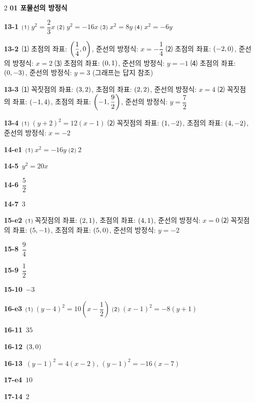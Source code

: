 \documentclass[10pt,a4paper]{article}
\begin{document}
\begin{multicols}{2}\small
\noindent\textbf{01 포물선의 방정식}\par\smallskip
\noindent\textbf{13-1}\ ⑴ $y^2=\dfrac{2}{3}x$ ⑵ $y^2=-16x$ ⑶ $x^2=8y$ ⑷ $x^2=-6y$\par
\noindent\textbf{13-2}\ ⑴ 초점의 좌표: $\left(\dfrac{1}{4}{,}\mkern3mu\mathopen{}0\right)$, 준선의 방정식: $x=-\dfrac{1}{4}$ ⑵ 초점의 좌표: $(-2{,}\mkern3mu\mathopen{}0)$, 준선의 방정식: $x=2$ ⑶ 초점의 좌표: $(0{,}\mkern3mu\mathopen{}1)$, 준선의 방정식: $y=-1$ ⑷ 초점의 좌표: $(0{,}\mkern3mu\mathopen{}-3)$, 준선의 방정식: $y=3$ (그래프는 답지 참조)\par
\noindent\textbf{13-3}\ ⑴ 꼭짓점의 좌표: $(3{,}\mkern3mu\mathopen{}2)$, 초점의 좌표: $(2{,}\mkern3mu\mathopen{}2)$, 준선의 방정식: $x=4$ ⑵ 꼭짓점의 좌표: $(-1{,}\mkern3mu\mathopen{}4)$, 초점의 좌표: $\left(-1{,}\mkern3mu\mathopen{}\dfrac{9}{2}\right)$, 준선의 방정식: $y=\dfrac{7}{2}$\par
\noindent\textbf{13-4}\ ⑴ $(y+2)^2=12(x-1)$ ⑵ 꼭짓점의 좌표: $(1{,}\mkern3mu\mathopen{}-2)$, 초점의 좌표: $(4{,}\mkern3mu\mathopen{}-2)$, 준선의 방정식: $x=-2$\par
\noindent\textbf{14-e1}\ ⑴ $x^2=-16y$ ⑵ $2$\par
\noindent\textbf{14-5}\ $y^2=20x$\par
\noindent\textbf{14-6}\ $\dfrac{5}{2}$\par
\noindent\textbf{14-7}\ $3$\par
\noindent\textbf{15-e2}\ ⑴ 꼭짓점의 좌표: $(2{,}\mkern3mu\mathopen{}1)$, 초점의 좌표: $(4{,}\mkern3mu\mathopen{}1)$, 준선의 방정식: $x=0$ ⑵ 꼭짓점의 좌표: $(5{,}\mkern3mu\mathopen{}-1)$, 초점의 좌표: $(5{,}\mkern3mu\mathopen{}0)$, 준선의 방정식: $y=-2$\par
\noindent\textbf{15-8}\ $\dfrac{9}{4}$\par
\noindent\textbf{15-9}\ $\dfrac{1}{2}$\par
\noindent\textbf{15-10}\ $-3$\par
\noindent\textbf{16-e3}\ ⑴ $(y-4)^2=10\left(x-\dfrac{1}{2}\right)$ ⑵ $(x-1)^2=-8(y+1)$\par
\noindent\textbf{16-11}\ $35$\par
\noindent\textbf{16-12}\ $(3{,}\mkern3mu\mathopen{}0)$\par
\noindent\textbf{16-13}\ $(y-1)^2=4(x-2)$, $(y-1)^2=-16(x-7)$\par
\noindent\textbf{17-e4}\ $10$\par
\noindent\textbf{17-14}\ $2$\par

\end{multicols}
\end{document}

